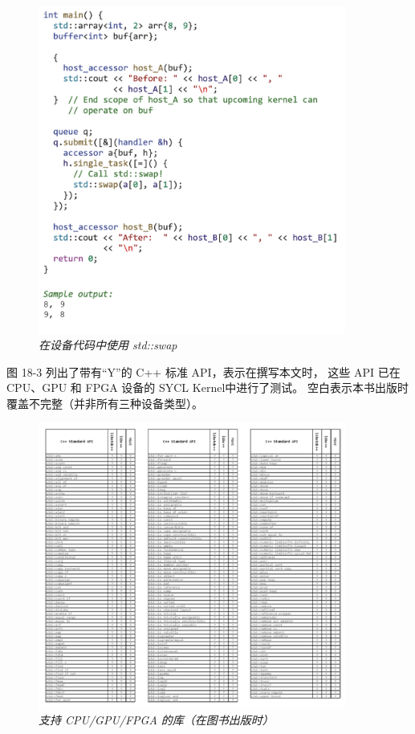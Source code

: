 \begin{figure}[H]
	\centering
	\includegraphics[width=0.9\textwidth]{figs/F18.2.png}
	\caption{\textit{在设备代码中使用 std::swap }}
\end{figure}

图 18-3 列出了带有“Y”的 C++ 标准 API，表示在撰写本文时，
这些 API 已在 CPU、GPU 和 FPGA 设备的 SYCL Kernel中进行了测试。 
空白表示本书出版时覆盖不完整（并非所有三种设备类型）。

\begin{figure}[H]
	\centering
	\includegraphics[width=0.9\textwidth]{figs/F18.3.png}
	\caption{\textit{支持 CPU/GPU/FPGA 的库（在图书出版时） }}
\end{figure}

